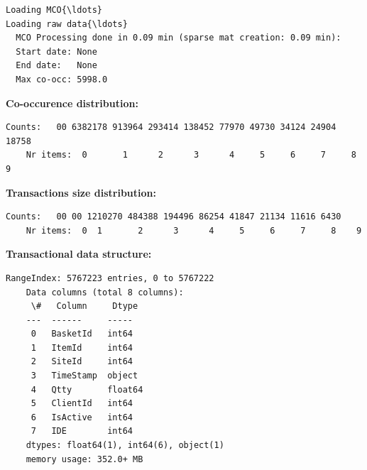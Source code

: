 \documentclass[11pt]{article}
\begin{document}
\begin{Verbatim}[commandchars=\\\{\},fontsize=\footnotesize]
Loading MCO{\ldots}
Loading raw data{\ldots}
  MCO Processing done in 0.09 min (sparse mat creation: 0.09 min):
  Start date: None
  End date:   None
  Max co-occ: 5998.0

\end{Verbatim}


    

    


    \textbf{Co-occurence distribution:}

    

\begin{Verbatim}[commandchars=\\\{\},fontsize=\footnotesize]
    Counts:   00 6382178 913964 293414 138452 77970 49730 34124 24904 18758
    Nr items:  0       1      2      3      4     5     6     7     8     9

\end{Verbatim}


    

    


    \textbf{Transactions size distribution:}

    

\begin{Verbatim}[commandchars=\\\{\},fontsize=\footnotesize]
    Counts:   00 00 1210270 484388 194496 86254 41847 21134 11616 6430
    Nr items:  0  1       2      3      4     5     6     7     8    9

\end{Verbatim}


    

    


    \textbf{Transactional data structure:}

    

\begin{Verbatim}[commandchars=\\\{\},fontsize=\footnotesize]
    RangeIndex: 5767223 entries, 0 to 5767222
    Data columns (total 8 columns):
     \#   Column     Dtype
    ---  ------     -----
     0   BasketId   int64
     1   ItemId     int64
     2   SiteId     int64
     3   TimeStamp  object
     4   Qtty       float64
     5   ClientId   int64
     6   IsActive   int64
     7   IDE        int64
    dtypes: float64(1), int64(6), object(1)
    memory usage: 352.0+ MB



\end{Verbatim}
\end{document}

